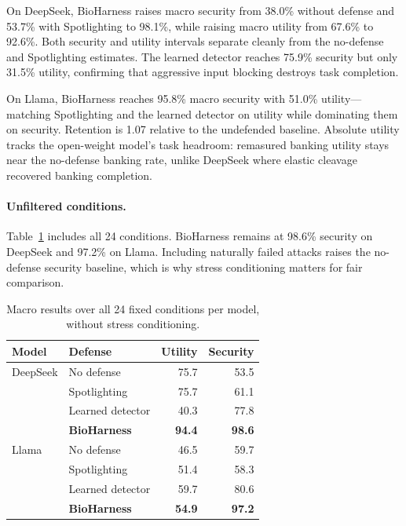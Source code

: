On DeepSeek, BioHarness raises macro security from 38.0\% without defense and 53.7\% with Spotlighting to 98.1\%, while raising macro utility from 67.6\% to 92.6\%. Both security and utility intervals separate cleanly from the no-defense and Spotlighting estimates. The learned detector reaches 75.9\% security but only 31.5\% utility, confirming that aggressive input blocking destroys task completion.

On Llama, BioHarness reaches 95.8\% macro security with 51.0\% utility---matching Spotlighting and the learned detector on utility while dominating them on security. Retention is 1.07 relative to the undefended baseline. Absolute utility tracks the open-weight model's task headroom: remasured banking utility stays near the no-defense banking rate, unlike DeepSeek where elastic cleavage recovered banking completion.

\paragraph{Unfiltered conditions.}
Table~\ref{tab:unfiltered-results} includes all 24 conditions. BioHarness remains at 98.6\% security on DeepSeek and 97.2\% on Llama. Including naturally failed attacks raises the no-defense security baseline, which is why stress conditioning matters for fair comparison.

\begin{table}[t]
\centering
\small
\setlength{\tabcolsep}{4pt}
\caption{Macro results over all 24 fixed conditions per model, without stress conditioning.}
\label{tab:unfiltered-results}
\begin{tabular}{llrr}
\toprule
Model & Defense & Utility & Security \\
\midrule
DeepSeek & No defense & 75.7 & 53.5 \\
 & Spotlighting & 75.7 & 61.1 \\
 & Learned detector & 40.3 & 77.8 \\
 & \textbf{BioHarness} & \textbf{94.4} & \textbf{98.6} \\
\midrule
Llama & No defense & 46.5 & 59.7 \\
 & Spotlighting & 51.4 & 58.3 \\
 & Learned detector & 59.7 & 80.6 \\
 & \textbf{BioHarness} & \textbf{54.9} & \textbf{97.2} \\
\bottomrule
\end{tabular}
\end{table}

